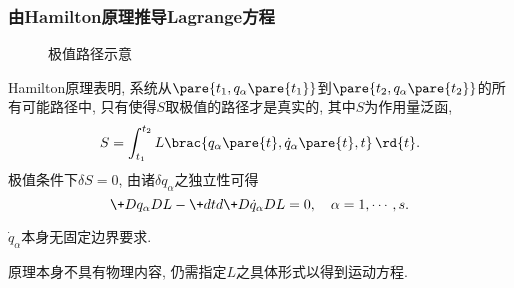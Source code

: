 \documentclass[../LectureNotes.tex]{subfiles}
\begin{document}
\subsubsection{由Hamilton原理推导Lagrange方程} %
\label{ssub:由hamilton原理推导lagrange方程}

\begin{figure}
    \centering
    \caption{极值路径示意}
    \label{fig:极值路径示意}
\end{figure}
Hamilton原理表明, 系统从$\pare{t_1, q_\alpha\pare{t_1}}$到$\pare{t_2, q_\alpha\pare{t_2}}$的所有可能路径中, 只有使得$S$取极值的路径才是真实的, 其中$S$为作用量泛函,
\[ S = \int_{t_1}^{t_2} L\brac{q_\alpha\pare{t},\dot{q}_\alpha\pare{t}, t}\,\rd{t}. \]
极值条件下$\delta S = 0$, 由诸$\delta q_\alpha$之独立性可得
\[ \+D{q_\alpha}DL - \+dtd{} \+D{\dot{q}_\alpha}DL = 0,\quad \alpha = 1,\cdots,s. \]
\begin{remark}
    $\dot{q}_\alpha$本身无固定边界要求.
\end{remark}
\begin{remark}
    原理本身不具有物理内容, 仍需指定$L$之具体形式以得到运动方程.
\end{remark}
\end{document}
